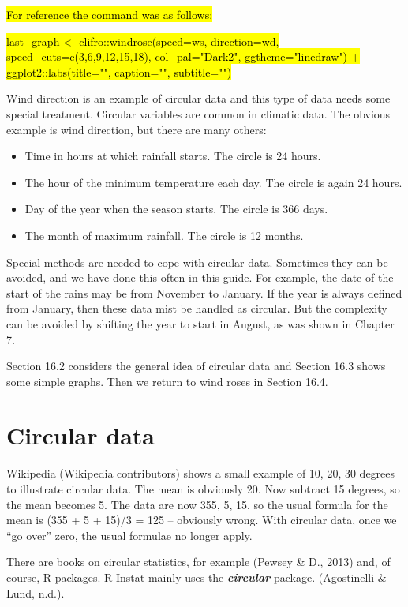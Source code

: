 \documentclass[
  letterpaper,
  DIV=11,
  numbers=noendperiod]{scrreprt}
\begin{document}
\hl{For reference the command was as follows:}

\hl{last\_graph \textless- clifro::windrose(speed=ws, direction=wd,
speed\_cuts=c(3,6,9,12,15,18), col\_pal="Dark2", ggtheme="linedraw") +
ggplot2::labs(title="", caption="", subtitle="")}

Wind direction is an example of circular data and this type of data
needs some special treatment. Circular variables are common in climatic
data. The obvious example is wind direction, but there are many others:

\begin{itemize}
\item
  Time in hours at which rainfall starts. The circle is 24 hours.
\item
  The hour of the minimum temperature each day. The circle is again 24
  hours.
\item
  Day of the year when the season starts. The circle is 366 days.
\item
  The month of maximum rainfall. The circle is 12 months.
\end{itemize}

Special methods are needed to cope with circular data. Sometimes they
can be avoided, and we have done this often in this guide. For example,
the date of the start of the rains may be from November to January. If
the year is always defined from January, then these data mist be handled
as circular. But the complexity can be avoided by shifting the year to
start in August, as was shown in Chapter 7.

Section 16.2 considers the general idea of circular data and Section
16.3 shows some simple graphs. Then we return to wind roses in Section
16.4.

\section{Circular data}\label{circular-data}

Wikipedia (Wikipedia contributors) shows a small example of 10, 20, 30
degrees to illustrate circular data. The mean is obviously 20. Now
subtract 15 degrees, so the mean becomes 5. The data are now 355, 5, 15,
so the usual formula for the mean is (355 + 5 + 15)/3 = 125 -- obviously
wrong. With circular data, once we ``go over'' zero, the usual formulae
no longer apply.

There are books on circular statistics, for example (Pewsey \& D., 2013)
and, of course, R packages. R-Instat mainly uses the
\textbf{\emph{circular}} package. (Agostinelli \& Lund, n.d.).
\end{document}
